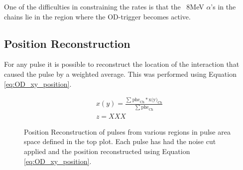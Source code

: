 \par
One of the difficulties in constraining the rates is that the ~8MeV $\alpha$'s in the chains lie in the region where the OD-trigger becomes active.


\subsection{Position Reconstruction}
\par
For any pulse it is possible to reconstruct the location of the interaction that caused the pulse by a weighted average.
This was performed using Equation \ref{eq:OD_xy_position}.

\begin{equation}
    \begin{array}{lcl}
        x(y) = \frac{\sum{\text{phe}_\text{Ch} * \text{x(y)}_\text{Ch}}}{\sum{\text{phe}_\text{Ch}}} \\
        z = XXX 
    \end{array}
    \label{eq:OD_xy_position}
\end{equation}


\begin{figure}[!htbp]%
\centering
{}
\caption{Position Reconstruction of pulses from various regions in pulse area space defined in the top plot. 
         Each pulse has had the noise cut applied and the position reconstructed using Equation \ref{eq:OD_xy_position}.}
\label{fig:od_backgrounds_position_reconstruction}
\end{figure}



